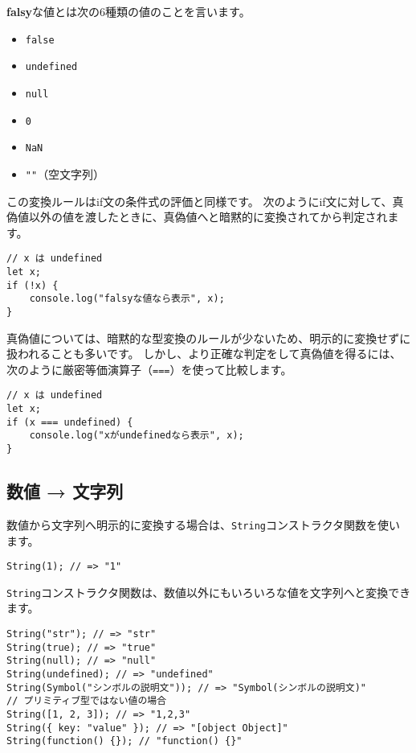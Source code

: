 \textbf{falsy}な値とは次の6種類の値のことを言います。

\begin{itemize}
\item
  \texttt{false}
\item
  \texttt{undefined}
\item
  \texttt{null}
\item
  \texttt{0}
\item
  \texttt{NaN}
\item
  \texttt{""}（空文字列）
\end{itemize}

この変換ルールはif文の条件式の評価と同様です。
次のようにif文に対して、真偽値以外の値を渡したときに、真偽値へと暗黙的に変換されてから判定されます。

\begin{lstlisting}
// x は undefined
let x; 
if (!x) {
    console.log("falsyな値なら表示", x); 
}
\end{lstlisting}

真偽値については、暗黙的な型変換のルールが少ないため、明示的に変換せずに扱われることも多いです。
しかし、より正確な判定をして真偽値を得るには、次のように厳密等価演算子（\texttt{===}）を使って比較します。\enlargethispage{\baselineskip}

\begin{lstlisting}
// x は undefined
let x;
if (x === undefined) {
    console.log("xがundefinedなら表示", x); 
}
\end{lstlisting}

\hypertarget{number-to-string}{%
\subsection{数値 → 文字列}\label{number-to-string}}

数値から文字列へ明示的に変換する場合は、\texttt{String}コンストラクタ関数を使います。

\begin{lstlisting}
String(1); // => "1"
\end{lstlisting}

\texttt{String}コンストラクタ関数は、数値以外にもいろいろな値を文字列へと変換できます。

\begin{lstlisting}
String("str"); // => "str"
String(true); // => "true"
String(null); // => "null"
String(undefined); // => "undefined"
String(Symbol("シンボルの説明文")); // => "Symbol(シンボルの説明文)"
// プリミティブ型ではない値の場合
String([1, 2, 3]); // => "1,2,3"
String({ key: "value" }); // => "[object Object]"
String(function() {}); // "function() {}"
\end{lstlisting}

